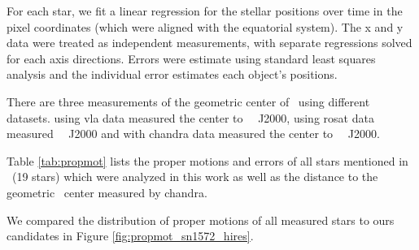 For each star, we fit a linear regression for the stellar positions over time in the pixel coordinates (which were aligned with the equatorial system). The x and y data were treated as independent measurements, with separate regressions solved for each axis directions. Errors were estimate using standard least squares analysis and the individual error estimates each object's positions.

There are three measurements of the geometric center of \ using different datasets. \cite{1997ApJ...491..816R} using \gls{vla} data measured the center to \ \ J2000,  \citet{2000ApJ...545L..53H} using \gls{rosat} data measured \  \ J2000 and \cite{2005ApJ...634..376W} with \gls{chandra} data measured the center to \ \ J2000. 

 Table \ref{tab:propmot} lists the proper motions and errors of all stars mentioned in \rl\ (19 stars) which were analyzed in this work as well as the distance to the geometric \xray\ center measured by \gls{chandra}.

We compared the distribution of proper motions of all measured stars to ours candidates in Figure \ref{fig:propmot_sn1572_hires}.

